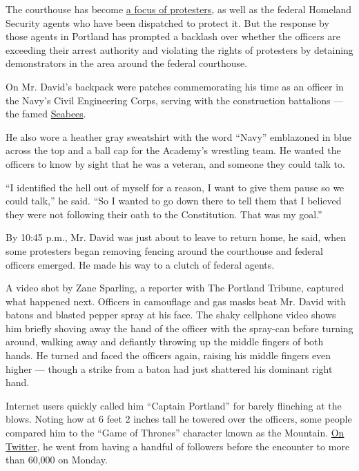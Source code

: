 The courthouse has become
\href{https://www.nytimes3xbfgragh.onion/2020/07/17/us/portland-protests.html}{a
focus of protesters}, as well as the federal Homeland Security agents
who have been dispatched to protect it. But the response by those agents
in Portland has prompted a backlash over whether the officers are
exceeding their arrest authority and violating the rights of protesters
by detaining demonstrators in the area around the federal courthouse.

On Mr. David's backpack were patches commemorating his time as an
officer in the Navy's Civil Engineering Corps, serving with the
construction battalions --- the famed
\href{https://www.navy.mil/navydata/personnel/seabees/seabee1.html}{Seabees}.

He also wore a heather gray sweatshirt with the word ``Navy'' emblazoned
in blue across the top and a ball cap for the Academy's wrestling team.
He wanted the officers to know by sight that he was a veteran, and
someone they could talk to.

``I identified the hell out of myself for a reason, I want to give them
pause so we could talk,'' he said. ``So I wanted to go down there to
tell them that I believed they were not following their oath to the
Constitution. That was my goal.''

By 10:45 p.m., Mr. David was just about to leave to return home, he
said, when some protesters began removing fencing around the courthouse
and federal officers emerged. He made his way to a clutch of federal
agents.

A video shot by Zane Sparling, a reporter with The Portland Tribune,
captured what happened next. Officers in camouflage and gas masks beat
Mr. David with batons and blasted pepper spray at his face. The shaky
cellphone video shows him briefly shoving away the hand of the officer
with the spray-can before turning around, walking away and defiantly
throwing up the middle fingers of both hands. He turned and faced the
officers again, raising his middle fingers even higher --- though a
strike from a baton had just shattered his dominant right hand.

Internet users quickly called him ``Captain Portland'' for barely
flinching at the blows. Noting how at 6 feet 2 inches tall he towered
over the officers, some people compared him to the ``Game of Thrones''
character known as the Mountain.
\href{https://twitter.com/Tazerface16}{On Twitter}, he went from having
a handful of followers before the encounter to more than 60,000 on
Monday.

